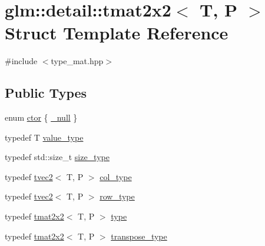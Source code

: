 \hypertarget{structglm_1_1detail_1_1tmat2x2}{}\section{glm\+:\+:detail\+:\+:tmat2x2$<$ T, P $>$ Struct Template Reference}
\label{structglm_1_1detail_1_1tmat2x2}


{\ttfamily \#include $<$type\+\_\+mat.\+hpp$>$}

\subsection*{Public Types}
\begin{DoxyCompactItemize}
\item 
enum \hyperlink{structglm_1_1detail_1_1tmat2x2_ac7c2fd8babbf9207cf08ffb92497a6c8}{ctor} \{ \hyperlink{structglm_1_1detail_1_1tmat2x2_ac7c2fd8babbf9207cf08ffb92497a6c8a3683117ef677621da178e009d7b8e2cf}{\+\_\+null}
 \}
\item 
typedef T \hyperlink{structglm_1_1detail_1_1tmat2x2_aa592f519609fc243aa0d63a843651a88}{value\+\_\+type}
\item 
typedef std\+::size\+\_\+t \hyperlink{structglm_1_1detail_1_1tmat2x2_abd8446f60873d982f61a108727193848}{size\+\_\+type}
\item 
typedef \hyperlink{structglm_1_1detail_1_1tvec2}{tvec2}$<$ T, P $>$ \hyperlink{structglm_1_1detail_1_1tmat2x2_ae8c6de6197aa1b65adf15c40197c04d1}{col\+\_\+type}
\item 
typedef \hyperlink{structglm_1_1detail_1_1tvec2}{tvec2}$<$ T, P $>$ \hyperlink{structglm_1_1detail_1_1tmat2x2_a4c5c3a87c9c7ff8e725e928e71c7a260}{row\+\_\+type}
\item 
typedef \hyperlink{structglm_1_1detail_1_1tmat2x2}{tmat2x2}$<$ T, P $>$ \hyperlink{structglm_1_1detail_1_1tmat2x2_a8d480bfd28c81ceebb28f78aa1fc5302}{type}
\item 
typedef \hyperlink{structglm_1_1detail_1_1tmat2x2}{tmat2x2}$<$ T, P $>$ \hyperlink{structglm_1_1detail_1_1tmat2x2_a91b971bd280c2387d22346261851033a}{transpose\+\_\+type}
\end{DoxyCompactItemize}
